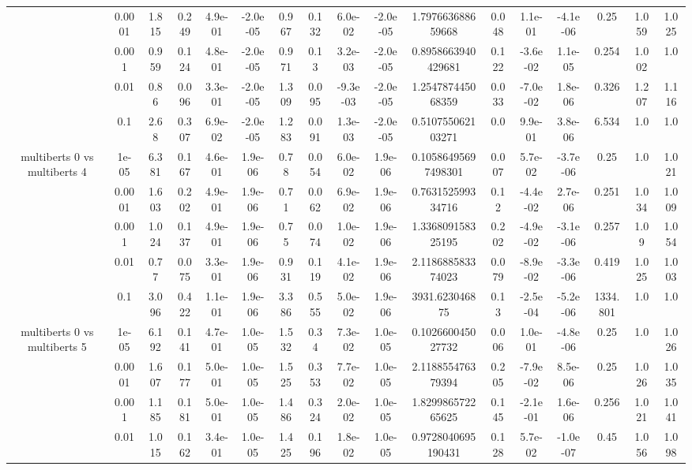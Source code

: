 \begin{tabular}{|c|c|c|c|c|c|c|c|c|c|c|c|c|c|c|c|c|}
 & 0.0001 & 1.815 & 0.249 & 4.9e-01 & -2.0e-05 & 0.967 & 0.132 & 6.0e-02 & -2.0e-05 & 1.797663688659668 & 0.048 & 1.1e-01 & -4.1e-06 & 0.25 & 1.059 & 1.025 \\
 & 0.001 & 0.959 & 0.124 & 4.8e-01 & -2.0e-05 & 0.971 & 0.13 & 3.2e-03 & -2.0e-05 & 0.8958663940429681 & 0.122 & -3.6e-02 & 1.1e-05 & 0.254 & 1.002 & 1.0 \\
 & 0.01 & 0.86 & 0.096 & 3.3e-01 & -2.0e-05 & 1.309 & 0.095 & -9.3e-03 & -2.0e-05 & 1.254787445068359 & 0.033 & -7.0e-02 & 1.8e-06 & 0.326 & 1.207 & 1.116 \\
 & 0.1 & 2.68 & 0.307 & 6.9e-02 & -2.0e-05 & 1.283 & 0.091 & 1.3e-03 & -2.0e-05 & 0.510755062103271 & 0.0 & 9.9e-01 & 3.8e-06 & 6.534 & 1.0 & 1.0 \\
\hline
\multirow{5}{*}{multiberts 0 vs multiberts 4} & 1e-05 & 6.381 & 0.167 & 4.6e-01 & 1.9e-06 & 0.78 & 0.054 & 6.0e-02 & 1.9e-06 & 0.10586495697498301 & 0.007 & 5.7e-02 & -3.7e-06 & 0.25 & 1.0 & 1.021 \\
 & 0.0001 & 1.603 & 0.202 & 4.9e-01 & 1.9e-06 & 0.71 & 0.062 & 6.9e-02 & 1.9e-06 & 0.763152599334716 & 0.12 & -4.4e-02 & 2.7e-06 & 0.251 & 1.034 & 1.009 \\
 & 0.001 & 1.024 & 0.137 & 4.9e-01 & 1.9e-06 & 0.75 & 0.074 & 1.0e-02 & 1.9e-06 & 1.336809158325195 & 0.202 & -4.9e-02 & -3.1e-06 & 0.257 & 1.09 & 1.054 \\
 & 0.01 & 0.77 & 0.075 & 3.3e-01 & 1.9e-06 & 0.931 & 0.119 & 4.1e-02 & 1.9e-06 & 2.118688583374023 & 0.079 & -8.9e-02 & -3.3e-06 & 0.419 & 1.025 & 1.003 \\
 & 0.1 & 3.096 & 0.422 & 1.1e-01 & 1.9e-06 & 3.386 & 0.555 & 5.0e-02 & 1.9e-06 & 3931.623046875 & 0.13 & -2.5e-04 & -5.2e-06 & 1334.801 & 1.0 & 1.0 \\
\hline
\multirow{5}{*}{multiberts 0 vs multiberts 5} & 1e-05 & 6.192 & 0.141 & 4.7e-01 & 1.0e-05 & 1.532 & 0.34 & 7.3e-02 & 1.0e-05 & 0.102660045027732 & 0.006 & 1.0e-01 & -4.8e-06 & 0.25 & 1.0 & 1.026 \\
 & 0.0001 & 1.607 & 0.177 & 5.0e-01 & 1.0e-05 & 1.525 & 0.353 & 7.7e-02 & 1.0e-05 & 2.118855476379394 & 0.205 & -7.9e-02 & 8.5e-06 & 0.25 & 1.026 & 1.035 \\
 & 0.001 & 1.185 & 0.181 & 5.0e-01 & 1.0e-05 & 1.486 & 0.324 & 2.0e-02 & 1.0e-05 & 1.829986572265625 & 0.145 & -2.1e-01 & 1.6e-06 & 0.256 & 1.021 & 1.041 \\
 & 0.01 & 1.015 & 0.162 & 3.4e-01 & 1.0e-05 & 1.425 & 0.196 & 1.8e-02 & 1.0e-05 & 0.9728040695190431 & 0.128 & 5.7e-02 & -1.0e-07 & 0.45 & 1.056 & 1.098 \\

\end{tabular}
